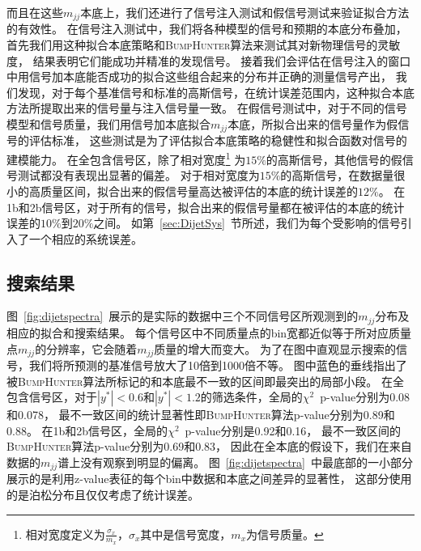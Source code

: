 而且在这些$m_{jj}$本底上，我们还进行了信号注入测试和假信号测试来验证拟合方法的有效性。
在信号注入测试中，我们将各种模型的信号和预期的本底分布叠加，
首先我们用这种拟合本底策略和\textsc{BumpHunter}算法来测试其对新物理信号的灵敏度，
结果表明它们能成功并精准的发现信号。
接着我们会评估在信号注入的窗口中用信号加本底能否成功的拟合这些组合起来的分布并正确的测量信号产出，
我们发现，对于每个基准信号和标准的高斯信号，在统计误差范围内，这种拟合本底方法所提取出来的信号量与注入信号量一致。
在假信号测试中，对于不同的信号模型和信号质量，我们用信号加本底拟合$m_{jj}$本底，所拟合出来的信号量作为假信号的评估标准，
这些测试是为了评估拟合本底策略的稳健性和拟合函数对信号的建模能力。
在全包含信号区，除了相对宽度\footnote{相对宽度定义为$\frac{\sigma_x}{m_x}$，$\sigma_x$其中是信号宽度，$m_x$为信号质量。}
为$15\%$的高斯信号，其他信号的假信号测试都没有表现出显著的偏差。
对于相对宽度为$15\%$的高斯信号，在数据量很小的高质量区间，拟合出来的假信号量高达被评估的本底的统计误差的$12\%$。
在1b和2b信号区，对于所有的信号，拟合出来的假信号量都在被评估的本底的统计误差的$10\%$到$20\%$之间。
如第~\ref{sec:DijetSys}~节所述，我们为每个受影响的信号引入了一个相应的系统误差。


\subsection{搜索结果}
\label{sec:DijetMjj4}


图~\ref{fig:dijetspectra}~展示的是实际的数据中三个不同信号区所观测到的$m_{jj}$分布及相应的拟合和搜索结果。
每个信号区中不同质量点的bin宽都近似等于所对应质量点$m_{jj}$的分辨率，它会随着$m_{jj}$质量的增大而变大。
为了在图中直观显示搜索的信号，我们将所预测的基准信号放大了10倍到1000倍不等。
图中蓝色的垂线指出了被\textsc{BumpHunter}算法所标记的和本底最不一致的区间即最突出的局部小段。
在全包含信号区，对于$|y^*|<0.6$和$|y^*|<1.2$的筛选条件，全局的$\chi^2$~p-value分别为0.08和0.078，
最不一致区间的统计显著性即\textsc{BumpHunter}算法p-value分别为0.89和0.88。
在1b和2b信号区，全局的$\chi^2$~p-value分别是0.92和0.16，
最不一致区间的\textsc{BumpHunter}算法p-value分别为0.69和0.83，
因此在全本底的假设下，我们在来自数据的$m_{jj}$谱上没有观察到明显的偏离。
图~\ref{fig:dijetspectra}~中最底部的一小部分展示的是利用z-value表征的每个bin中数据和本底之间差异的显著性，
这部分使用的是泊松分布且仅仅考虑了统计误差。




